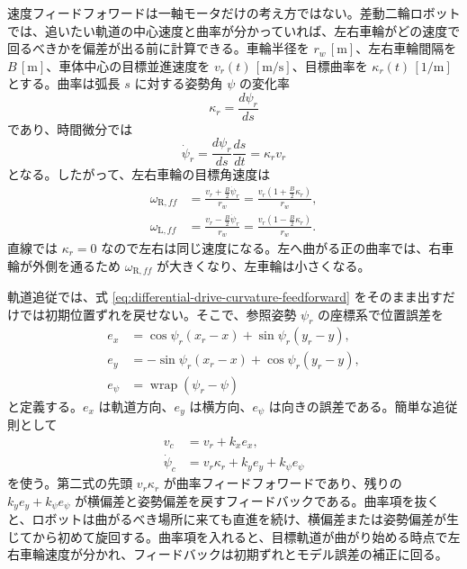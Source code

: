 速度フィードフォワードは一軸モータだけの考え方ではない。差動二輪ロボットでは、追いたい軌道の中心速度と曲率が分かっていれば、左右車輪がどの速度で回るべきかを偏差が出る前に計算できる。車輪半径を $r_w\,[\mathrm{m}]$、左右車輪間隔を $B\,[\mathrm{m}]$、車体中心の目標並進速度を $v_r(t)\,[\mathrm{m/s}]$、目標曲率を $\kappa_r(t)\,[1/\mathrm{m}]$ とする。曲率は弧長 $s$ に対する姿勢角 $\psi$ の変化率
\begin{equation}
  \kappa_r=\frac{d\psi_r}{ds}
  \label{eq:path-curvature-definition}
\end{equation}
であり、時間微分では
\begin{equation}
  \dot{\psi}_r
  =
  \frac{d\psi_r}{ds}\frac{ds}{dt}
  =
  \kappa_r v_r
  \label{eq:yaw-rate-curvature}
\end{equation}
となる。したがって、左右車輪の目標角速度は
\begin{align}
  \omega_{\mathrm{R},ff}
  &=
  \frac{
    v_r+\frac{B}{2}\dot{\psi}_r
  }{r_w}
  =
  \frac{
    v_r\left(1+\frac{B}{2}\kappa_r\right)
  }{r_w},\\
  \omega_{\mathrm{L},ff}
  &=
  \frac{
    v_r-\frac{B}{2}\dot{\psi}_r
  }{r_w}
  =
  \frac{
    v_r\left(1-\frac{B}{2}\kappa_r\right)
  }{r_w}.
  \label{eq:differential-drive-curvature-feedforward}
\end{align}
直線では $\kappa_r=0$ なので左右は同じ速度になる。左へ曲がる正の曲率では、右車輪が外側を通るため $\omega_{\mathrm{R},ff}$ が大きくなり、左車輪は小さくなる。

軌道追従では、式 \eqref{eq:differential-drive-curvature-feedforward} をそのまま出すだけでは初期位置ずれを戻せない。そこで、参照姿勢 $\psi_r$ の座標系で位置誤差を
\begin{align}
  e_x&=\cos\psi_r(x_r-x)+\sin\psi_r(y_r-y),\\
  e_y&=-\sin\psi_r(x_r-x)+\cos\psi_r(y_r-y),\\
  e_\psi&=\operatorname{wrap}(\psi_r-\psi)
  \label{eq:trajectory-error-frame}
\end{align}
と定義する。$e_x$ は軌道方向、$e_y$ は横方向、$e_\psi$ は向きの誤差である。簡単な追従則として
\begin{align}
  v_c&=v_r+k_xe_x,\\
  \dot{\psi}_c&=v_r\kappa_r+k_y e_y+k_\psi e_\psi
  \label{eq:curvature-feedforward-feedback-law}
\end{align}
を使う。第二式の先頭 $v_r\kappa_r$ が曲率フィードフォワードであり、残りの $k_y e_y+k_\psi e_\psi$ が横偏差と姿勢偏差を戻すフィードバックである。曲率項を抜くと、ロボットは曲がるべき場所に来ても直進を続け、横偏差または姿勢偏差が生じてから初めて旋回する。曲率項を入れると、目標軌道が曲がり始める時点で左右車輪速度が分かれ、フィードバックは初期ずれとモデル誤差の補正に回る。

